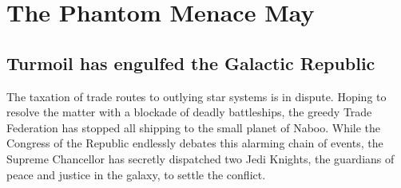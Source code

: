 \chapter{The Phantom Menace	May}
\section{Turmoil has engulfed the Galactic Republic}
The taxation of trade routes to outlying star systems is in 
dispute. Hoping to resolve the matter with a blockade of 
deadly battleships, the greedy Trade Federation has stopped 
all shipping to the small planet of Naboo. While the Congress 
of the Republic endlessly debates this alarming chain of 
events, the Supreme Chancellor has secretly dispatched two 
Jedi Knights, the guardians of peace and justice in the 
galaxy, to settle the conflict.

\lipsum[1-10]
\cite{CHAUDHURI_2014}
\cite{MROWCZYNSKI_1998}
